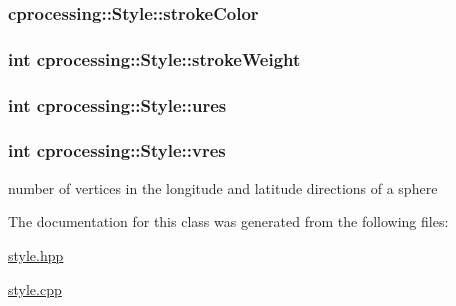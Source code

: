 \hypertarget{classcprocessing_1_1Style_a23b32198997fa6b8da302adf7810f79b}{
\subsubsection[{stroke\-Color}]{ {\bf cprocessing\-::\-Style\-::stroke\-Color}}}\label{classcprocessing_1_1Style_a23b32198997fa6b8da302adf7810f79b}
\hypertarget{classcprocessing_1_1Style_a94d3946ede16f831add95bc8b51b593c}{
\subsubsection[{stroke\-Weight}]{\setlength{\rightskip}{0pt plus 5cm}int {\bf cprocessing\-::\-Style\-::stroke\-Weight}}}\label{classcprocessing_1_1Style_a94d3946ede16f831add95bc8b51b593c}
\hypertarget{classcprocessing_1_1Style_a273318013798fe01a929a718089bcd41}{
\subsubsection[{ures}]{\setlength{\rightskip}{0pt plus 5cm}int {\bf cprocessing\-::\-Style\-::ures}}}\label{classcprocessing_1_1Style_a273318013798fe01a929a718089bcd41}
\hypertarget{classcprocessing_1_1Style_a84582322d95a21a724c07d9c4aea0ca9}{
\subsubsection[{vres}]{\setlength{\rightskip}{0pt plus 5cm}int {\bf cprocessing\-::\-Style\-::vres}}}\label{classcprocessing_1_1Style_a84582322d95a21a724c07d9c4aea0ca9}


number of vertices in the longitude and latitude directions of a sphere 



\-The documentation for this class was generated from the following files\-:\begin{DoxyCompactItemize}
\item 
\hyperlink{style_8hpp}{style.\-hpp}\item 
\hyperlink{style_8cpp}{style.\-cpp}\end{DoxyCompactItemize}
